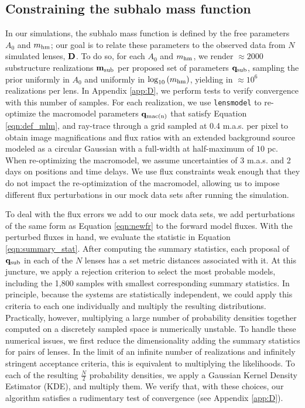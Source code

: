 \subsection{Constraining the subhalo mass function}
\label{ssec:to_posterior}
In our simulations, the subhalo mass function is defined by the free parameters $A_0$ and $m_{\rm{hm}}$; our goal is to relate these parameters to the observed data from $N$ simulated lenses, $\bf{D}$. To do so, for each $A_0$ and $m_{\rm{hm}}$, we render $\approx 2000$ substructure realizations ${\bf{m}_{\rm{sub}}}$ per proposed set of parameters ${\bf{q}_{\rm{sub}}}$, sampling the prior uniformly in $A_0$ and uniformly in $\log_{10}\left(m_{\rm{hm}}\right)$, yielding in $\approx 10^6$ realizations per lens. In Appendix \ref{app:D}, we perform tests to verify convergence with this number of samples. For each realization, we use {\tt{lensmodel}} to re-optimize the macromodel parameters ${\bf{q}_{\rm{mac(n)}}}$ that satisfy Equation \ref{eqn:def_mlm}, and ray-trace through a grid sampled at 0.4 m.a.s. per pixel to obtain image magnifications and flux ratios with an extended background source modeled as a circular Gaussian with a full-width at half-maximum of $10$ pc. When re-optimizing the macromodel, we assume uncertainties of 3 m.a.s. and 2 days on positions and time delays. We use flux constraints weak enough that they do not impact the re-optimization of the macromodel, allowing us to impose different flux perturbations in our mock data sets after running the simulation. 

To deal with the flux errors we add to our mock data sets, we add perturbations of the same form as Equation \ref{eqn:newfr} to the forward model fluxes. With the perturbed fluxes in hand, we evaluate the statistic in Equation \ref{eqn:summary_stat}. After computing the summary statistics, each proposal of ${\bf{q}_{\rm{sub}}}$ in each of the $N$ lenses has a set metric distances associated with it. At this juncture, we apply a rejection criterion to select the most probable models, including the 1,800 samples with smallest corresponding summary statistics. In principle, because the systems are statistically independent, we could apply this criteria to each one individually and multiply the resulting distributions. Practically, however, multiplying a large number of probability densities together computed on a discretely sampled space is numerically unstable. To handle these numerical issues, we first reduce the dimensionality adding the summary statistics for pairs of lenses. In the limit of an infinite number of realizations and infinitely stringent acceptance criteria, this is equivalent to multiplying the likelihoods. To each of the resulting $\frac{N}{2}$ probability densities, we apply a Gaussian Kernel Density Estimator (KDE), and multiply them. We verify that, with these choices, our algorithm satisfies a rudimentary test of convergence (see Appendix \ref{app:D}).

